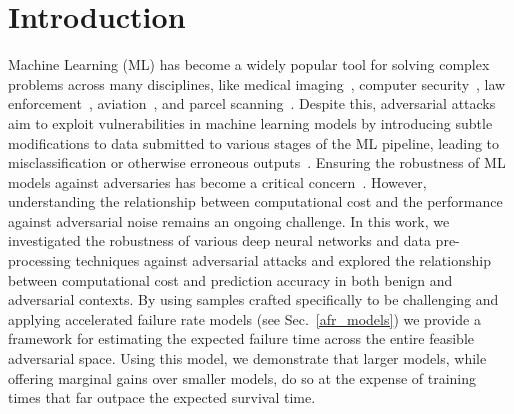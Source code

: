 \section{Introduction}

Machine Learning (ML) has become a widely popular tool for solving complex problems across many disciplines, like medical imaging~\citep{ai_medical_imaging}, computer security~\citep{ai_security}, law enforcement~\citep{ai_prison}, aviation~\citep{ai_aviation}, and parcel scanning~\cite{ai_luggage}. Despite this, adversarial attacks aim to exploit vulnerabilities in machine learning models by introducing subtle modifications to data submitted to various stages of the ML pipeline, leading to misclassification or otherwise erroneous outputs~\citep{chakraborty_adversarial_2018}. Ensuring the robustness of ML models against adversaries has become a critical concern~\citep{adversarialpatch,carlini_towards_2017,croce_reliable_2020,hopskipjump,art2018,meyers}. However, understanding the relationship between computational cost and the performance against adversarial noise remains an ongoing challenge.  In this work, we investigated the robustness of various deep neural networks and data pre-processing techniques against adversarial attacks and explored the relationship between computational cost and  prediction accuracy in both benign and adversarial contexts.  By using samples crafted specifically to be challenging and applying accelerated failure rate models (see Sec.~\ref{afr_models}) we provide a framework for estimating the expected failure time across the entire feasible adversarial space. Using this model, we demonstrate that larger models, while offering marginal gains over smaller models, do so at the expense of training times that far outpace the expected survival time.

